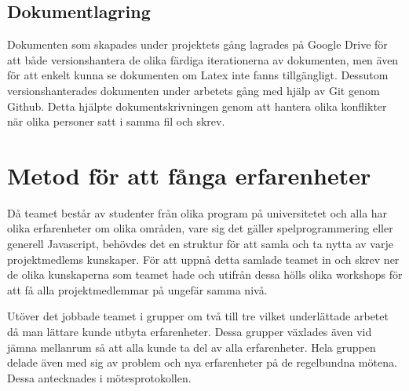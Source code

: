 \subsection{Dokumentlagring}
Dokumenten som skapades under projektets gång lagrades på Google Drive för att både versionshantera de olika färdiga iterationerna av dokumenten, men även för att enkelt kunna se dokumenten om Latex inte fanns tillgängligt. Dessutom versionshanterades dokumenten under arbetets gång med hjälp av Git genom Github. Detta hjälpte dokumentskrivningen genom att hantera olika konflikter när olika personer satt i samma fil och skrev.

\section{Metod för att fånga erfarenheter}
Då teamet består av studenter från olika program på universitetet och alla har olika erfarenheter om olika områden, vare sig det gäller spelprogrammering eller generell Javascript, behövdes det en struktur för att samla och ta nytta av varje projektmedlems kunskaper. För att uppnå detta samlade teamet in och skrev ner de olika kunskaperna som teamet hade och utifrån dessa hölls olika workshops för att få alla projektmedlemmar på ungefär samma nivå.

Utöver det jobbade teamet i grupper om två till tre vilket underlättade arbetet då man lättare kunde utbyta erfarenheter. Dessa grupper växlades även vid jämna mellanrum så att alla kunde ta del av alla erfarenheter. Hela gruppen delade även med sig av problem och nya erfarenheter på de regelbundna mötena. Dessa antecknades i mötesprotokollen.
